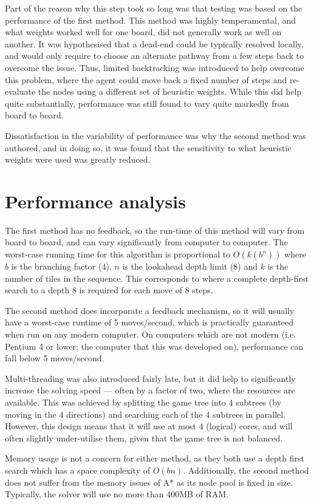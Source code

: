 \documentclass[a4paper, 11pt, titlepage]{report}
\begin{document}
Part of the reason why this step took so long was that testing was based on the performance of the first method. This method was highly temperamental, and what weights worked well for one board, did not generally work as well on another. It was hypothesised that a dead-end could be typically resolved locally, and would only require to choose an alternate pathway from a few steps back to overcome the issue. Thus, limited backtracking was introduced to help overcome this problem, where the agent could move back a fixed number of steps and re-evaluate the nodes using a different set of heuristic weights. While this did help quite substantially, performance was still found to vary quite markedly from board to board.

Dissatisfaction in the variability of performance was why the second method was authored, and in doing so, it was found that the sensitivity to what heuristic weights were used was greatly reduced.

\section{Performance analysis}
The first method has no feedback, so the run-time of this method will vary from board to board, and can vary significantly from computer to computer. The worst-case running time for this algorithm is proportional to $O(k(b^n))$ where $b$ is the branching factor (4), $n$ is the lookahead depth limit (8) and $k$ is the number of tiles in the sequence. This corresponds to where a complete depth-first search to a depth 8 is required for each move of 8 steps.

The second method does incorporate a feedback mechanism, so it will usually have a worst-case runtime of 5 moves/second, which is practically guaranteed when run on any modern computer. On computers which are not modern (i.e. Pentium 4 or lower; the computer that this was developed on), performance can fall below 5 moves/second.

Multi-threading was also introduced fairly late, but it did help to significantly increase the solving speed --- often by a factor of two, where the resources are available. This was achieved by splitting the game tree into 4 subtrees (by moving in the 4 directions) and searching each of the 4 subtrees in parallel. However, this design means that it will use at most 4 (logical) cores, and will often slightly under-utilise them, given that the game tree is not balanced.

Memory usage is not a concern for either method, as they both use a depth first search which has a space complexity of $O(bn)$. Additionally, the second method does not suffer from the memory issues of A* as its node pool is fixed in size. Typically, the solver will use no more than 400MB of RAM.
\end{document}
